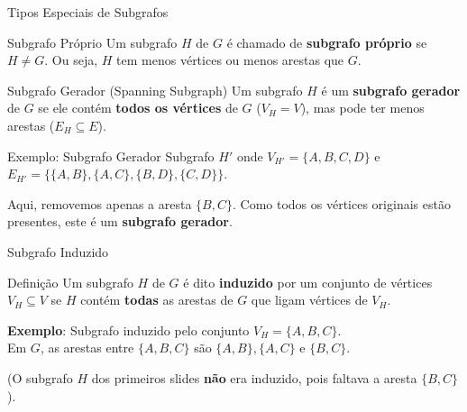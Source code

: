 \documentclass[9pt]{beamer}
\begin{document}
\begin{frame}{Tipos Especiais de Subgrafos}
    \begin{block}{Subgrafo Próprio}
        Um subgrafo $H$ de $G$ é chamado de \textbf{subgrafo próprio} se $H \neq G$. Ou seja, $H$ tem menos vértices ou menos arestas que $G$.
    \end{block}
    
    \begin{block}{Subgrafo Gerador (Spanning Subgraph)}
        Um subgrafo $H$ é um \textbf{subgrafo gerador} de $G$ se ele contém \textbf{todos os vértices} de $G$ ($V_H = V$), mas pode ter menos arestas ($E_H \subseteq E$).
    \end{block}
\end{frame}

\begin{frame}{Exemplo: Subgrafo Gerador}
    Subgrafo $H'$ onde $V_{H'} = \{A, B, C, D\}$ e $E_{H'} = \{\{A,B\}, \{A,C\}, \{B,D\}, \{C,D\}\}$.
    \vspace{0.5cm}
    \begin{center}
    \end{center}
    Aqui, removemos apenas a aresta $\{B,C\}$. Como todos os vértices originais estão presentes, este é um \textbf{subgrafo gerador}.
\end{frame}

\begin{frame}{Subgrafo Induzido}
    \begin{block}{Definição}
        Um subgrafo $H$ de $G$ é dito \textbf{induzido} por um conjunto de vértices $V_H \subseteq V$ se $H$ contém \textbf{todas} as arestas de $G$ que ligam vértices de $V_H$.
    \end{block}
    \vspace{0.5cm}
    \textbf{Exemplo}: Subgrafo induzido pelo conjunto $V_H = \{A, B, C\}$. \\
    Em $G$, as arestas entre $\{A, B, C\}$ são $\{A,B\}, \{A,C\}$ e $\{B,C\}$.
    \begin{center}
    \end{center}
    (O subgrafo $H$ dos primeiros slides \textbf{não} era induzido, pois faltava a aresta $\{B,C\}$).
\end{frame}
\end{document}
